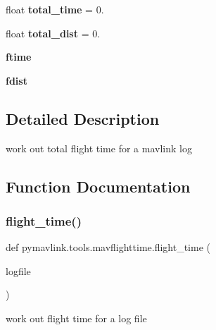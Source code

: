 \begin{DoxyCompactItemize}
\item 
\mbox{\label{namespacepymavlink_1_1tools_1_1mavflighttime_a3ee5454b529e2f7f9985884461827257}} 
float {\bfseries total\+\_\+time} = 0.
\item 
\mbox{\label{namespacepymavlink_1_1tools_1_1mavflighttime_afaa3f1a3fc0e84f459a2ca1dc610b675}} 
float {\bfseries total\+\_\+dist} = 0.
\item 
\mbox{\label{namespacepymavlink_1_1tools_1_1mavflighttime_a81d150a709fc078862f38f5fe22a3edf}} 
{\bfseries ftime}
\item 
\mbox{\label{namespacepymavlink_1_1tools_1_1mavflighttime_a58110227862890831ae4bd03a0491f36}} 
{\bfseries fdist}
\end{DoxyCompactItemize}


\subsection{Detailed Description}
\begin{DoxyVerb}work out total flight time for a mavlink log
\end{DoxyVerb}
 

\subsection{Function Documentation}
\mbox{\label{namespacepymavlink_1_1tools_1_1mavflighttime_a20110edf75eca397a2929bc07ce011ca}} 
\subsubsection{\texorpdfstring{flight\+\_\+time()}{flight\_time()}}
{\footnotesize\ttfamily def pymavlink.\+tools.\+mavflighttime.\+flight\+\_\+time (\begin{DoxyParamCaption}\item[{}]{logfile }\end{DoxyParamCaption})}

\begin{DoxyVerb}work out flight time for a log file\end{DoxyVerb}
 
